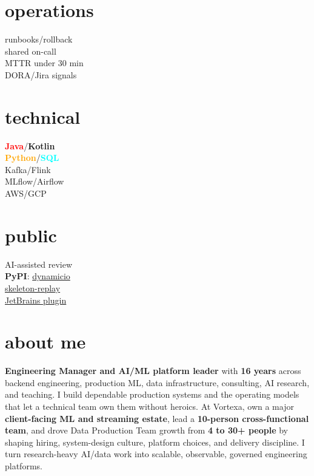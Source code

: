 \documentclass[]{../../friggeri-cv}
\begin{document}
\begin{aside}
    \section{operations}
        {\footnotesize runbooks/rollback\\shared on-call\\MTTR under 30 min\\DORA/Jira signals}
    \section{technical}
        {\footnotesize \textbf{\textcolor{red}{Java}}/\textbf{\textcolor{red!50!black}{Kotlin}}\\\textbf{\textcolor{orange}{Python}}/\textbf{\textcolor{cyan}{SQL}}\\Kafka/Flink\\MLflow/Airflow\\AWS/GCP}
    \section{public}
        {\footnotesize AI-assisted review\\\textbf{PyPI}: \href{https://pypi.org/project/dynamicio/}{dynamicio}\\\href{https://pypi.org/project/skeleton-replay/}{skeleton-replay}\\\href{https://plugins.jetbrains.com/plugin/32807-skeleton-replay}{JetBrains plugin}}
\end{aside}

\section{about me}
{\small \textbf{Engineering Manager and AI/ML platform leader} with \textbf{16 years} across backend engineering, production ML, data infrastructure, consulting, AI research, and teaching. I build dependable production systems and the operating models that let a technical team own them without heroics. At Vortexa, own a major \textbf{client-facing ML and streaming estate}, lead a \textbf{10-person cross-functional team}, and drove Data Production Team growth from \textbf{4 to 30+ people} by shaping hiring, system-design culture, platform choices, and delivery discipline. I turn research-heavy AI/data work into scalable, observable, governed engineering platforms.}
\end{document}
